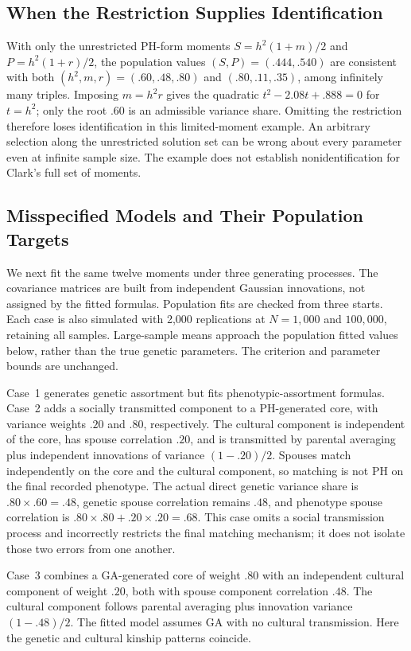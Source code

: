 \subsection{When the Restriction Supplies Identification}
With only the unrestricted PH-form moments
$S=h^2(1+m)/2$ and $P=h^2(1+r)/2$, the population values
$(S,P)=(.444,.540)$ are consistent with both
$(h^2,m,r)=(.60,.48,.80)$ and $(.80,.11,.35)$, among infinitely many
triples. Imposing $m=h^2r$ gives the quadratic
$t^2-2.08t+.888=0$ for $t=h^2$; only the root $.60$ is an admissible
variance share. Omitting the restriction therefore loses identification
in this limited-moment example. An arbitrary selection along the
unrestricted solution set can be wrong about every parameter even at
infinite sample size. The example does not establish nonidentification
for Clark's full set of moments.

\subsection{Misspecified Models and Their Population Targets}
We next fit the same twelve moments under three generating processes.
The covariance matrices are built from independent Gaussian innovations,
not assigned by the fitted formulas. Population fits are checked from
three starts. Each case is also simulated with 2,000 replications at
$N=1{,}000$ and $100{,}000$, retaining all samples. Large-sample means
approach the population fitted values below, rather than the true genetic
parameters. The criterion and parameter bounds are unchanged.

Case~1 generates genetic assortment but fits phenotypic-assortment
formulas. Case~2 adds a socially transmitted component to a PH-generated
core, with variance weights $.20$ and $.80$, respectively. The cultural
component is independent of the core, has spouse correlation $.20$, and
is transmitted by parental averaging plus independent innovations of
variance $(1-.20)/2$. Spouses match independently on the core and the
cultural component, so matching is not PH on the final recorded phenotype.
The actual direct genetic variance share is $.80\times.60=.48$, genetic
spouse correlation remains $.48$, and phenotype spouse correlation is
$.80\times.80+.20\times.20=.68$. This case omits a social transmission
process and incorrectly restricts the final matching mechanism; it does
not isolate those two errors from one another.

Case~3 combines a GA-generated core of weight $.80$ with an independent
cultural component of weight $.20$, both with spouse component correlation
$.48$. The cultural component follows parental averaging plus innovation
variance $(1-.48)/2$. The fitted model assumes GA with no cultural
transmission. Here the genetic and cultural kinship patterns coincide.

